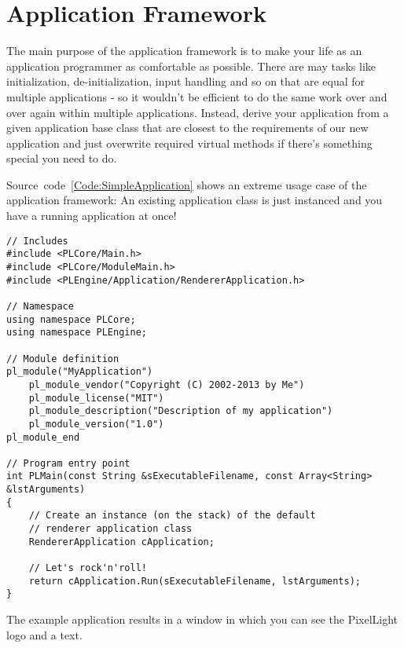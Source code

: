 \section{Application Framework}
The main purpose of the application framework is to make your life as an application programmer as comfortable as possible. There are may tasks like initialization, de-initialization, input handling and so on that are equal for multiple applications - so it wouldn't be efficient to do the same work over and over again within multiple applications. Instead, derive your application from a given application base class that are closest to the requirements of our new application and just overwrite required virtual methods if there's something special you need to do.

Source~code~\ref{Code:SimpleApplication} shows an extreme usage case of the application framework: An existing application class is just instanced and you have a running application at once!
\begin{lstlisting}[label=Code:SimpleApplication,caption={Simple application using the application framework}]
// Includes
#include <PLCore/Main.h>
#include <PLCore/ModuleMain.h>
#include <PLEngine/Application/RendererApplication.h>

// Namespace
using namespace PLCore;
using namespace PLEngine;

// Module definition
pl_module("MyApplication")
	pl_module_vendor("Copyright (C) 2002-2013 by Me")
	pl_module_license("MIT")
	pl_module_description("Description of my application")
	pl_module_version("1.0")
pl_module_end

// Program entry point
int PLMain(const String &sExecutableFilename, const Array<String> &lstArguments)
{
	// Create an instance (on the stack) of the default
	// renderer application class
	RendererApplication cApplication;

	// Let's rock'n'roll!
	return cApplication.Run(sExecutableFilename, lstArguments);
}
\end{lstlisting}
The example application results in a window in which you can see the PixelLight logo and a text.
